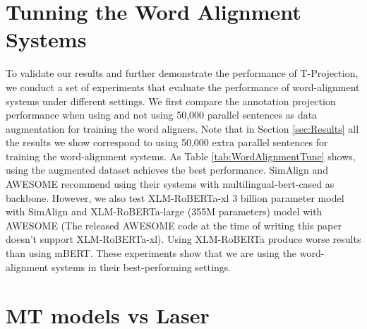 \documentclass[11pt]{article}
\begin{document}
\section{Tunning the Word Alignment Systems}
\label{sec:alignmentTune}
To validate our results and further demonstrate the performance of T-Projection, we conduct a set of experiments that evaluate the performance of word-alignment systems under different settings. We first compare the annotation projection performance when using and not using 50,000 parallel sentences as data augmentation for training the word aligners. Note that in Section \ref{sec:Results} all the results we show correspond to using 50,000 extra parallel sentences for training the word-alignment systems. As Table \ref{tab:WordAlignmentTune} shows, using the augmented dataset achieves the best performance. SimAlign \cite{DBLP:conf/eacl/DouN21} and AWESOME \cite{DBLP:conf/eacl/DouN21} recommend using their systems with multilingual-bert-cased \cite{DBLP:conf/naacl/DevlinCLT19} as backbone. However, we also test XLM-RoBERTa-xl \cite{xlmr} 3 billion parameter model with SimAlign and XLM-RoBERTa-large (355M parameters) model with AWESOME (The released AWESOME code at the time of writing this paper doesn't support XLM-RoBERTa-xl). Using XLM-RoBERTa produce worse results than using mBERT. These experiments show that we are using the word-alignment systems in their best-performing settings. 


\section{MT models vs Laser}

\begin{table*}[htb]
    \centering
\caption{Results of T-Projection when selecting candidates using translation probability scores with different MT systems vs using the cosine similarity of the multilingual vector representations of the candidates computed using LASER 2.0}
\label{tab:laser}
\end{table*}
\end{document}
